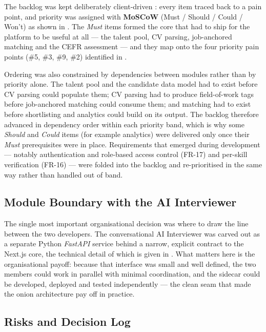 The backlog was kept deliberately client-driven
\parencite{Cohn2004UserStories}: every item traced back to a
pain point, and priority was assigned with \textbf{MoSCoW}
\parencite{DSDMMoSCoW}
(Must / Should / Could / Won't) as shown in
. The \emph{Must} items formed the
core that had to ship for the platform to be useful at all --- the talent
pool, CV parsing, job-anchored matching and the CEFR assessment --- and they
map onto the four priority pain points (\#5, \#3, \#9, \#2) identified in
.

Ordering was also constrained by dependencies between modules rather than by
priority alone. The talent pool and the candidate data model had to exist
before CV parsing could populate them; CV parsing had to produce
field-of-work tags before job-anchored matching could consume them; and
matching had to exist before shortlisting and analytics could build on its
output. The backlog therefore advanced in dependency order within each
priority band, which is why some \emph{Should} and \emph{Could} items (for
example analytics) were delivered only once their \emph{Must} prerequisites
were in place. Requirements that emerged during development --- notably
authentication and role-based access control (FR-17) and per-skill
verification (FR-16) --- were folded into the backlog and re-prioritised in
the same way rather than handled out of band.

\subsection{Module Boundary with the AI Interviewer}
\label{sec:method-boundary}

The single most important organisational decision was where to draw the line
between the two developers. The conversational AI Interviewer was carved out
as a separate Python \textit{FastAPI} service behind a narrow, explicit
contract to the Next.js core, the technical detail of which is given in
. What matters here is the organisational payoff: because
that interface was small and well defined, the two members could work in
parallel with minimal coordination, and the sidecar could be developed,
deployed and tested independently --- the clean seam that made the onion
architecture pay off in practice.

\subsection{Risks and Decision Log}
\label{sec:method-risks}

